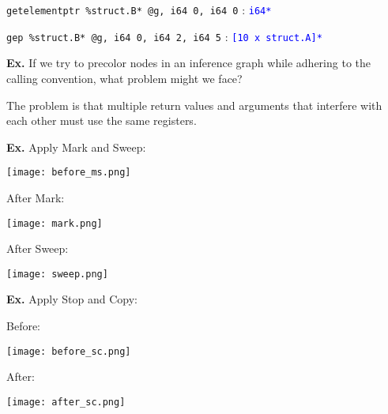\texttt{getelementptr \%struct.B* @g, i64 0, i64 0} : \textcolor{blue}{\texttt{i64*}}

\texttt{gep \%struct.B* @g, i64 0, i64 2, i64 5} : \textcolor{blue}{\texttt{[10 x struct.A]*}}

\hrulefill

\textbf{Ex.} If we try to precolor nodes in an inference graph while adhering to the calling convention, what problem might we face?\medskip

The problem is that multiple return values and arguments that interfere with each other must use the same registers.

\hrulefill

\textbf{Ex.} Apply Mark and Sweep:

\vspace{-11pt}
\begin{center}
	\texttt{[image: before\_ms.png]}
\end{center}

\begin{multicols*}{2}
	After Mark:

	\texttt{[image: mark.png]}

	After Sweep:

	\texttt{[image: sweep.png]}
\end{multicols*}

\hrulefill

\textbf{Ex.} Apply Stop and Copy:
\begin{multicols*}{2}
	Before:

	\texttt{[image: before\_sc.png]}
	\columnbreak

	After:
	\vspace{-11pt}

	\texttt{[image: after\_sc.png]}
\end{multicols*}
